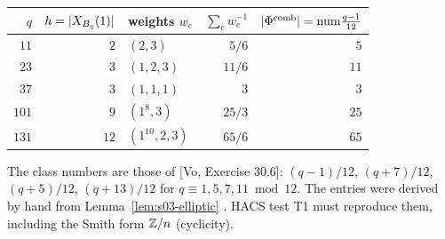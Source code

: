 \begin{example}[T1 data]\label{ex:s03-mazur}
\begin{center}\small
\begin{tabular}{rrlrr}\toprule
$q$ & $h=|X_{B_q}(1)|$ & weights $w_e$ & $\sum_ew_e^{-1}$ & $|\Phi^{\mathrm{comb}}|=\mathrm{num}\frac{q-1}{12}$\\\midrule
$11$ & $2$ & $(2,3)$ & $5/6$ & $5$\\
$23$ & $3$ & $(1,2,3)$ & $11/6$ & $11$\\
$37$ & $3$ & $(1,1,1)$ & $3$ & $3$\\
$101$ & $9$ & $(1^8,3)$ & $25/3$ & $25$\\
$131$ & $12$ & $(1^{10},2,3)$ & $65/6$ & $65$\\\bottomrule
\end{tabular}
\end{center}
The class numbers are those of [Vo, Exercise 30.6]: $(q-1)/12$, $(q+7)/12$, $(q+5)/12$, $(q+13)/12$ for $q\equiv1,5,7,11\bmod12$.
The entries were derived by hand from Lemma~\ref{lem:s03-elliptic} \stsketch. HACS test T1 must reproduce them, including the Smith
form $\mathbb{Z}/n$ (cyclicity).
\end{example}

